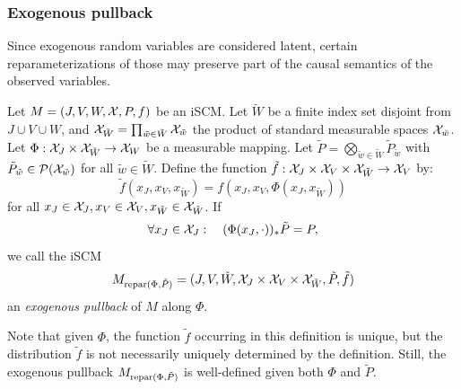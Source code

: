 \begin{Eg}
\end{Eg}

\subsubsection{Exogenous pullback}

Since exogenous random variables are considered latent, certain reparameterizations of those may preserve part of the causal semantics of the observed variables.
\begin{Def}\label{def:exogenous_pullback}
  Let $M = \left ( J, V, W, \mathcal{X}, P, f \right )$ be an iSCM.
  Let $\tilde{W}$ be a finite index set disjoint from $J \cup V \cup W$, and $\mathcal{X}_{\tilde{W}} = \prod_{\tilde{w}\in\tilde{W}} \mathcal{X}_{\tilde{w}}$ the product of standard measurable spaces $\mathcal{X}_{\tilde{w}}$. 
  Let $\Phi : \mathcal{X}_J \times \mathcal{X}_{\tilde{W}} \to \mathcal{X}_W$ be a measurable mapping.
  Let $\tilde{P} = \bigotimes_{\tilde{w}\in\tilde{W}} \tilde{P}_{\tilde{w}}$ with $\tilde{P}_{\tilde{w}} \in \mathcal{P}(\mathcal{X}_{\tilde{w}})$ for all $\tilde{w}\in\tilde{W}$.
  Define the function $\tilde{f} : \mathcal{X}_{J} \times \mathcal{X}_{V} \times \mathcal{X}_{\tilde{W}} \to \mathcal{X}_{V}$ by:
    $$\tilde{f}(x_J,x_V,x_{\tilde{W}}) = f(x_J,x_V,\Phi(x_J,x_{\tilde{W}}))$$
  for all $x_J \in \mathcal{X}_J, x_V \in \mathcal{X}_V, x_{\tilde{W}} \in \mathcal{X}_{\tilde{W}}$.
  If 
    $$\forall x_J \in \mathcal{X}_J: \quad (\Phi(x_J,\cdot))_* \tilde{P} = P,$$
  we call the iSCM
    $$M_{\mathrm{repar}({\Phi},{\tilde{P}})} = ( J, V, \tilde{W}, \mathcal{X}_J \times \mathcal{X}_V \times \mathcal{X}_{\tilde{W}}, \tilde{P}, \tilde{f} )$$
  an \emph{exogenous pullback} of $M$ along $\Phi$.
\end{Def}
Note that given $\Phi$, the function $\tilde{f}$ occurring in this definition is unique, but the distribution $\tilde f$ is not necessarily uniquely determined by the definition.
Still, the exogenous pullback $M_{\mathrm{repar}({\Phi},{\tilde{P}})}$ is well-defined given both $\Phi$ and $\tilde{P}$.

